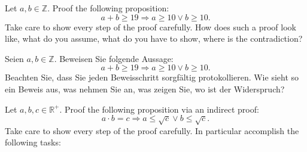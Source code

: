 \documentclass[a4paper,11pt]{exam}
\theoremstyle{definition}
\begin{document}
\printanswers

\begin{center} 
\end{center}


\newtheorem{theorem}{Theorem}
\theoremstyle{definition}
\newtheorem{example}{Example}

\begin{questions}
Let $a, b \in \mathbb{Z}$. Proof the following proposition:
\[a + b \geq 19 \Rightarrow a \geq 10 \lor b \geq 10.\]
Take care to show every step of the proof carefully. How does such a proof look like, what do you assume, what do you have to show, where is the contradiction?

\begin{otherlanguage}{german}
Seien $a, b \in \mathbb{Z}$. Beweisen Sie folgende Aussage:
\[a + b \geq 19 \Rightarrow a \geq 10 \lor b \geq 10.\]
Beachten Sie, dass Sie jeden Beweisschritt sorgfältig protokollieren. Wie sieht so ein Beweis aus, was nehmen Sie an, was zeigen Sie, wo ist der Widerspruch?
\end{otherlanguage}

Let $a, b, c \in \mathbb{R}^+$. Proof the following proposition via an indirect proof:
\[a \cdot b = c \Rightarrow a \leq \sqrt{c} \lor b \leq \sqrt{c}.\]
Take care to show every step of the proof carefully. In particular accomplish the following tasks:
\end{questions}
\end{document}
